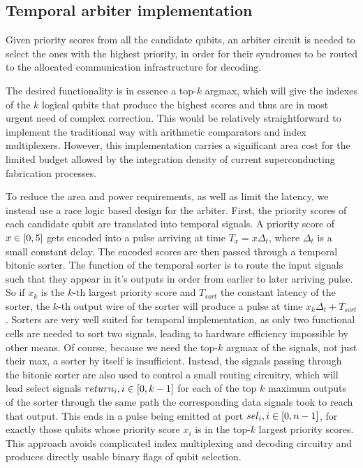 \documentclass{article}
\begin{document}
\subsection{Temporal arbiter implementation}

Given priority scores from all the candidate qubits, an
arbiter circuit is needed to select the ones with the
highest priority, in order for their syndromes to be routed
to the allocated communication infrastructure for decoding.

The desired functionality is in essence a top-$k$ argmax,
which will give the indexes of the $k$ logical qubits that
produce the highest scores and thus are in most urgent need
of complex correction. This would be relatively
straightforward to implement the traditional way with
arithmetic comparators and index multiplexers. However, this
implementation carries a significant area cost for the
limited budget allowed by the integration density of current
superconducting fabrication processes.

To reduce the area and power requirements, as well as limit
the latency, we instead use a race logic based design for
the arbiter. First, the priority scores of each candidate
qubit are translated into temporal signals. A priority score
of $x \in \interval{0}{5}$ gets encoded into a pulse
arriving at time $T_x = x {\Delta}_t$, where ${\Delta}_t$ is
a small constant delay. The encoded scores are then passed
through a temporal bitonic sorter. The function of the
temporal sorter is to route the input signals such that they
appear in it's outputs in order from earlier to later
arriving pulse. So if $x_k$ is the $k$-th largest priority
score and $T_{sort}$ the constant latency of the sorter, the
$k$-th output wire of the sorter will produce a pulse at
time $x_k {\Delta}_t + T_{sort}$. Sorters are very well
suited for temporal implementation, as only two functional
cells are needed to sort two signals, leading to hardware
efficiency impossible by other means. Of course, because we
need the top-$k$ argmax of the signals, not just their max,
a sorter by itself is insufficient. Instead, the signals
passing through the bitonic sorter are also used to control
a small routing circuitry, which will lead select signals
$return_i, i \in \interval{0}{k-1}$ for each of the top $k$
maximum outputs of the sorter through the same path the
corresponding data signals took to reach that output. This
ends in a pulse being emitted at port $sel_i, i \in
\interval{0}{n-1}$, for exactly those qubits whose priority
score $x_i$ is in the top-$k$ largest priority scores. This
approach avoids complicated index multiplexing and decoding
circuitry and produces directly usable binary flags of qubit
selection.
\end{document}
